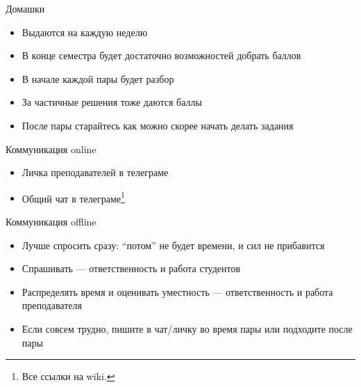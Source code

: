     \begin{frame}{Домашки}
        \begin{itemize}
            \item Выдаются на каждую неделю
            \item В конце семестра будет достаточно возможностей добрать баллов
            \item В начале каждой пары будет разбор
            \item За частичные решения тоже даются баллы
            \item После пары старайтесь как можно скорее начать делать задания
        \end{itemize}
    \end{frame}

    \begin{frame}[fragile]{Коммуникация online}
        \begin{itemize}
            \item Личка преподавателей в телеграме
            \item Общий чат в телеграме\footnote{Все ссылки на wiki.}
        \end{itemize}
    \end{frame}

    \begin{frame}[fragile]{Коммуникация offline}
        \begin{itemize}
            \item Лучше спросить сразу: ``потом'' не будет времени, и сил не прибавится
            \item Спрашивать --- ответственность и работа студентов
            \item Распределять время и оценивать уместность --- ответственность и работа преподавателя
            \item Если совсем трудно, пишите в чат/личку во время пары или подходите после пары
        \end{itemize}
    \end{frame}

